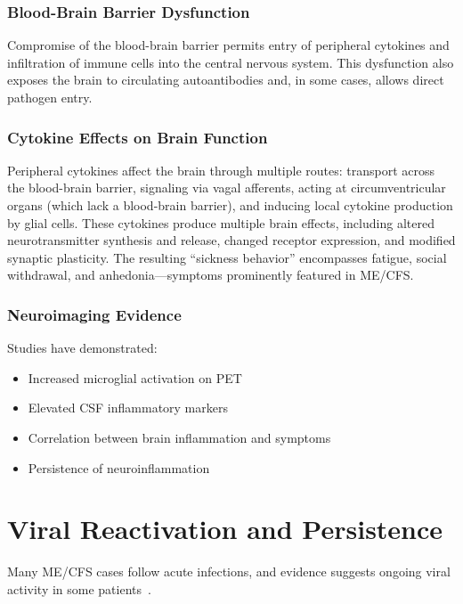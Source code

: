 \subsubsection{Blood-Brain Barrier Dysfunction}

Compromise of the blood-brain barrier permits entry of peripheral cytokines and infiltration of immune cells into the central nervous system. This dysfunction also exposes the brain to circulating autoantibodies and, in some cases, allows direct pathogen entry.

\subsubsection{Cytokine Effects on Brain Function}

Peripheral cytokines affect the brain through multiple routes: transport across the blood-brain barrier, signaling via vagal afferents, acting at circumventricular organs (which lack a blood-brain barrier), and inducing local cytokine production by glial cells. These cytokines produce multiple brain effects, including altered neurotransmitter synthesis and release, changed receptor expression, and modified synaptic plasticity. The resulting ``sickness behavior'' encompasses fatigue, social withdrawal, and anhedonia—symptoms prominently featured in ME/CFS.

\subsubsection{Neuroimaging Evidence}

Studies have demonstrated:
\begin{itemize}
    \item Increased microglial activation on PET
    \item Elevated CSF inflammatory markers
    \item Correlation between brain inflammation and symptoms
    \item Persistence of neuroinflammation
\end{itemize}

\section{Viral Reactivation and Persistence}
\label{sec:viral}

Many ME/CFS cases follow acute infections, and evidence suggests ongoing viral activity in some patients~\cite{EatonFitch2019}.

